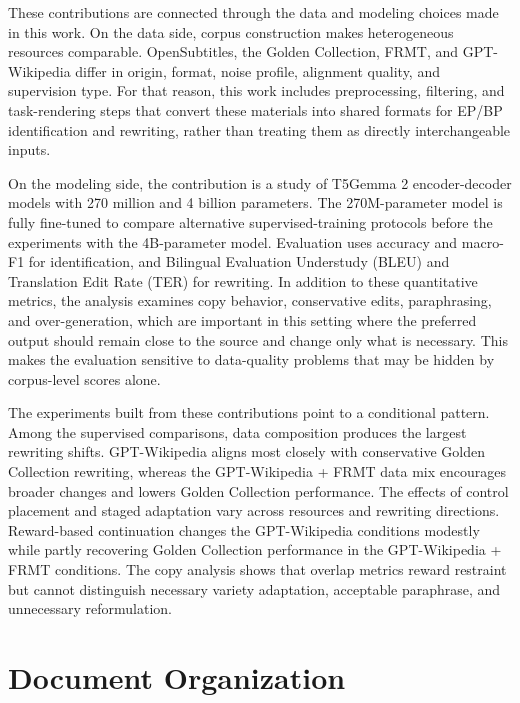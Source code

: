 These contributions are connected through the data and modeling choices made in
this work. On the data side, corpus construction makes heterogeneous
resources comparable. OpenSubtitles, the Golden Collection, FRMT, and
GPT-Wikipedia differ in origin, format, noise profile, alignment quality, and
supervision type. For that reason, this work includes preprocessing, filtering,
and task-rendering steps that convert these materials into shared formats for
EP/BP identification and rewriting, rather than treating them as directly
interchangeable inputs.

On the modeling side, the contribution is a study of T5Gemma 2
\citep{zhang2025t5gemma2seeingreading} encoder-decoder models with 270 million
and 4 billion parameters. The 270M-parameter model is fully fine-tuned to compare alternative
supervised-training protocols before the experiments with the 4B-parameter
model.
Evaluation uses accuracy and macro-F1
for identification, and Bilingual Evaluation Understudy (BLEU)
\citep{papineni2002bleu} and Translation Edit Rate (TER)
\citep{snover2006study} for rewriting. In addition to these quantitative
metrics, the analysis examines copy behavior, conservative edits,
paraphrasing, and over-generation, which are important in this setting where
the preferred output should remain close to the source and change only what is
necessary. This makes the evaluation sensitive to data-quality problems that
may be hidden by corpus-level scores alone.

The experiments built from these contributions point to a conditional pattern.
Among the supervised comparisons, data composition produces the largest
rewriting shifts. GPT-Wikipedia aligns most closely with conservative Golden
Collection rewriting, whereas the GPT-Wikipedia + FRMT data mix encourages broader changes and
lowers Golden Collection performance. The effects of control placement and
staged adaptation vary across resources and rewriting directions. Reward-based
continuation changes the GPT-Wikipedia conditions modestly while partly
recovering Golden Collection performance in the GPT-Wikipedia + FRMT conditions.
The copy analysis shows that overlap metrics reward restraint but cannot
distinguish necessary
variety adaptation, acceptable paraphrase, and unnecessary reformulation.

\section{Document Organization}
\label{sec:intro-document-organization}

